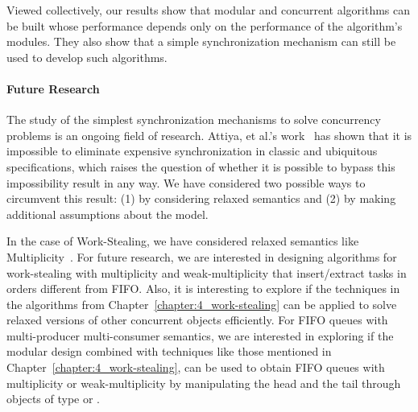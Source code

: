 Viewed collectively, our results show that modular and concurrent algorithms can be built whose performance depends only on the performance of the algorithm's modules. They also show that a simple synchronization mechanism can still be used to develop such algorithms.

\paragraph{Future Research}

The study of the simplest synchronization mechanisms to solve concurrency problems is an ongoing field of research. Attiya, et al.'s work~\cite{DBLP_conf_popl_AttiyaGHKMV11} has shown that it is impossible to eliminate expensive synchronization in classic and ubiquitous specifications, which raises the question of whether it is possible to bypass this impossibility result in any way. We have considered two possible ways to circumvent this result: (1) by considering relaxed semantics and (2) by making additional assumptions about the model.

In the case of Work-Stealing, we have considered relaxed semantics like Multiplicity~\cite{DBLP_journals_dc_CastanedaRR23, DBLP_conf_opodis_CastanedaRR20}. For future research, we are interested in designing algorithms for work-stealing with multiplicity and weak-multiplicity that insert/extract tasks in orders different from FIFO. Also, it is interesting to explore if the techniques in the algorithms from Chapter~\ref{chapter:4_work-stealing} can be applied to solve relaxed versions of other concurrent objects efficiently. For FIFO queues with multi-producer multi-consumer semantics, we are interested in exploring if the modular design combined with techniques like those mentioned in Chapter~\ref{chapter:4_work-stealing}, can be used to obtain FIFO queues with multiplicity or weak-multiplicity by manipulating the head and the tail through objects of type \MaxR or \RMaxR.






